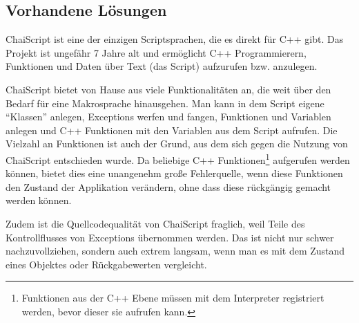   \subsection{Vorhandene Lösungen}
  \label{ssec:Vorhandene Lösungen}
    ChaiScript \autocite{chai-script} ist eine der einzigen Scriptsprachen, die es direkt für C++ gibt. Das Projekt ist ungefähr 7 Jahre alt und ermöglicht C++ Programmierern, Funktionen und Daten über Text (das Script) aufzurufen bzw. anzulegen.

    ChaiScript bietet von Hause aus viele Funktionalitäten an, die weit über den Bedarf für eine Makrosprache hinausgehen. Man kann in dem Script eigene ``Klassen'' anlegen, Exceptions werfen und fangen, Funktionen und Variablen anlegen und C++ Funktionen mit den Variablen aus dem Script aufrufen. Die Vielzahl an Funktionen ist auch der Grund, aus dem sich gegen die Nutzung von ChaiScript entschieden wurde. Da beliebige C++ Funktionen\footnote{
      Funktionen aus der C++ Ebene müssen mit dem Interpreter registriert werden, bevor dieser sie aufrufen kann.
    } aufgerufen werden können, bietet dies eine unangenehm große Fehlerquelle, wenn diese Funktionen den Zustand der Applikation verändern, ohne dass diese rückgängig gemacht werden können.

    Zudem ist die Quellcodequalität von ChaiScript fraglich, weil Teile des Kontrollflusses von Exceptions übernommen werden. Das ist nicht nur schwer nachzuvollziehen, sondern auch extrem langsam, wenn man es mit dem Zustand eines Objektes oder Rückgabewerten vergleicht.

